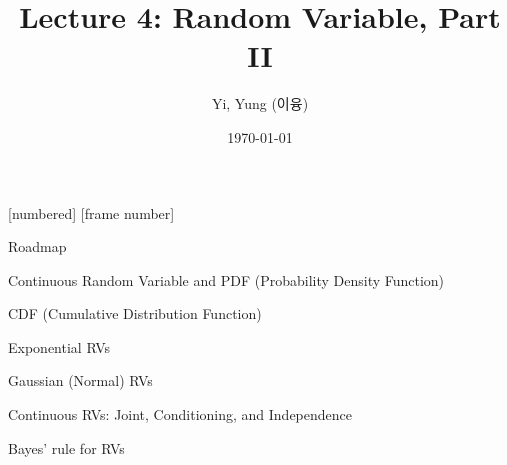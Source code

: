 

\csname\pdfmode\endcsname

{
  [numbered]
  [frame number]  %
}



\title[]{Lecture 4: Random Variable, Part II}
\author{Yi, Yung (이융)}
\date{\today}












\begin{frame}
  \titlepage
\end{frame}




\begin{frame}{Roadmap}


\plitemsep 0.1in
\bce[(1)]
\item Continuous Random Variable and PDF (Probability Density Function)

\item CDF (Cumulative Distribution Function)

\item Exponential RVs

\item Gaussian (Normal) RVs

\item Continuous RVs: Joint, Conditioning, and Independence

\item Bayes' rule for RVs

\ece
\end{frame}

